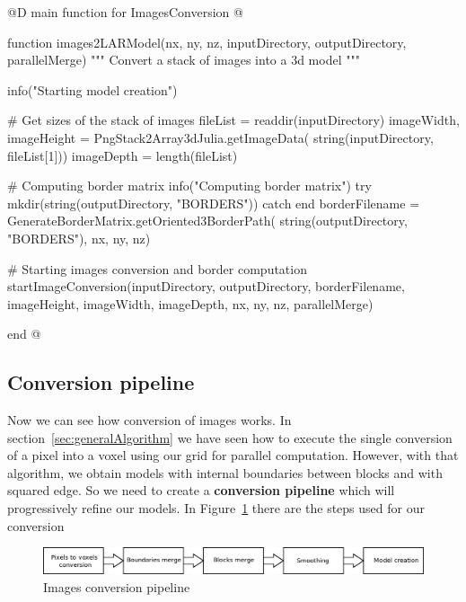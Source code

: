 \documentclass[11pt,oneside]{article}	%
\begin{document}
@D main function for ImagesConversion
@{function images2LARModel(nx, ny, nz,
                         inputDirectory, outputDirectory,
                         parallelMerge)
  """
  Convert a stack of images into a 3d model
  """

  info("Starting model creation")

  # Get sizes of the stack of images
  fileList = readdir(inputDirectory)
  imageWidth, imageHeight = PngStack2Array3dJulia.getImageData(
    string(inputDirectory, fileList[1]))
  imageDepth = length(fileList)

  # Computing border matrix
  info("Computing border matrix")
  try
    mkdir(string(outputDirectory, "BORDERS"))
  catch
  end
  borderFilename = GenerateBorderMatrix.getOriented3BorderPath(
    string(outputDirectory, "BORDERS"), nx, ny, nz)

  # Starting images conversion and border computation
  startImageConversion(inputDirectory, outputDirectory, borderFilename,
                       imageHeight, imageWidth, imageDepth,
                       nx, ny, nz,
                       parallelMerge)

end
@}

\subsection{Conversion pipeline}\label{sec:conversionpipeline}

Now we can see how conversion of images works. In section~\ref{sec:generalAlgorithm} we have seen how to execute the single conversion of a pixel into a voxel using our grid for parallel computation. However, with that algorithm, we obtain models with internal boundaries between blocks and with squared edge. So we need to create a \textbf{conversion pipeline} which will progressively refine our models. In Figure~\ref{fig:Pipeline} there are the steps used for our conversion

\begin{figure}[htb] %
   \centering
   \includegraphics[width=1.10\linewidth]{images/Pipeline.png}
   \caption{Images conversion pipeline}
   \label{fig:Pipeline}
\end{figure}
\end{document}
